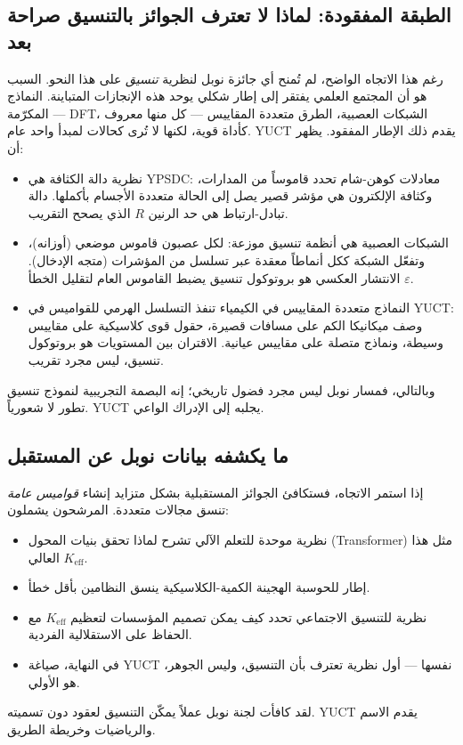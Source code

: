 \documentclass[12pt,a4paper]{article}
\begin{document}
	\subsection{الطبقة المفقودة: لماذا لا تعترف الجوائز بالتنسيق صراحة بعد}
	
	رغم هذا الاتجاه الواضح، لم تُمنح أي جائزة نوبل لنظرية \emph{تنسيق} على هذا النحو. السبب هو أن المجتمع العلمي يفتقر إلى إطار شكلي يوحد هذه الإنجازات المتباينة. النماذج المكرّمة — DFT، الشبكات العصبية، الطرق متعددة المقاييس — كل منها معروف كأداة قوية، لكنها لا تُرى كحالات لمبدأ واحد عام. YUCT يقدم ذلك الإطار المفقود. يظهر أن:
	\begin{itemize}
		\item نظرية دالة الكثافة هي YPSDC: معادلات كوهن-شام تحدد قاموساً من المدارات، وكثافة الإلكترون هي مؤشر قصير يصل إلى الحالة متعددة الأجسام بأكملها. دالة تبادل-ارتباط هي حد الرنين \(R\) الذي يصحح التقريب.
		\item الشبكات العصبية هي أنظمة تنسيق موزعة: لكل عصبون قاموس موضعي (أوزانه)، وتفعّل الشبكة ككل أنماطاً معقدة عبر تسلسل من المؤشرات (متجه الإدخال). الانتشار العكسي هو بروتوكول تنسيق يضبط القاموس العام لتقليل الخطأ \(\varepsilon\).
		\item النماذج متعددة المقاييس في الكيمياء تنفذ التسلسل الهرمي للقواميس في YUCT: وصف ميكانيكا الكم على مسافات قصيرة، حقول قوى كلاسيكية على مقاييس وسيطة، ونماذج متصلة على مقاييس عيانية. الاقتران بين المستويات هو بروتوكول تنسيق، ليس مجرد تقريب.
	\end{itemize}
	وبالتالي، فمسار نوبل ليس مجرد فضول تاريخي؛ إنه البصمة التجريبية لنموذج تنسيق تطور لا شعورياً. YUCT يجلبه إلى الإدراك الواعي.
	
	\subsection{ما يكشفه بيانات نوبل عن المستقبل}
	
	إذا استمر الاتجاه، فستكافئ الجوائز المستقبلية بشكل متزايد إنشاء \emph{قواميس عامة} تنسق مجالات متعددة. المرشحون يشملون:
	\begin{itemize}
		\item نظرية موحدة للتعلم الآلي تشرح لماذا تحقق بنيات المحول (Transformer) مثل هذا \(K_{\mathrm{eff}}\) العالي.
		\item إطار للحوسبة الهجينة الكمية-الكلاسيكية ينسق النظامين بأقل خطأ.
		\item نظرية للتنسيق الاجتماعي تحدد كيف يمكن تصميم المؤسسات لتعظيم \(K_{\mathrm{eff}}\) مع الحفاظ على الاستقلالية الفردية.
		\item في النهاية، صياغة YUCT نفسها — أول نظرية تعترف بأن التنسيق، وليس الجوهر، هو الأولي.
	\end{itemize}
	لقد كافأت لجنة نوبل عملاً يمكّن التنسيق لعقود دون تسميته. YUCT يقدم الاسم والرياضيات وخريطة الطريق.
	
\end{document}
